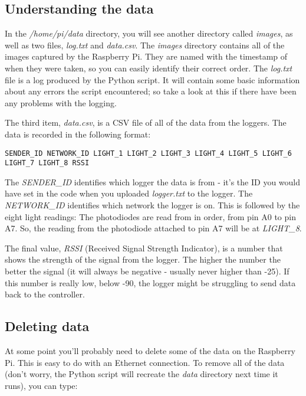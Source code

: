 \documentclass[10pt]{article}
\begin{document}
\subsection{Understanding the data}

In the \textit{/home/pi/data} directory, you will see another directory called \textit{images}, as well as two files, \textit{log.txt} and \textit{data.csv}. The \textit{images} directory contains all of the images captured by the Raspberry Pi. They are named with the timestamp of when they were taken, so you can easily identify their correct order. The \textit{log.txt} file is a log produced by the Python script. It will contain some basic information about any errors the script encountered; so take a look at this if there have been any problems with the logging. 

The third item, \textit{data.csv}, is a CSV file of all of the data from the loggers. The data is recorded in the following format: 

\begin{verbatim}
SENDER_ID NETWORK_ID LIGHT_1 LIGHT_2 LIGHT_3 LIGHT_4 LIGHT_5 LIGHT_6 LIGHT_7 LIGHT_8 RSSI
\end{verbatim}

The \textit{SENDER\_ID} identifies which logger the data is from - it's the ID you would have set in the code when you uploaded \textit{logger.txt} to the logger. The \textit{NETWORK\_ID} identifies which network the logger is on. This is followed by the eight light readings: The photodiodes are read from in order, from pin A0 to pin A7. So, the reading from the photodiode attached to pin A7 will be at \textit{LIGHT\_8}. 

The final value, \textit{RSSI} (Received Signal Strength Indicator), is a number that shows the strength of the signal from the logger. The higher the number the better the signal (it will always be negative - usually never higher than -25). If this number is really low, below -90, the logger might be struggling to send data back to the controller.

\subsection{Deleting data}

At some point you'll probably need to delete some of the data on the Raspberry Pi. This is easy to do with an Ethernet connection. To remove all of the data (don't worry, the Python script will recreate the \textit{data} directory next time it runs), you can type:
\end{document}
